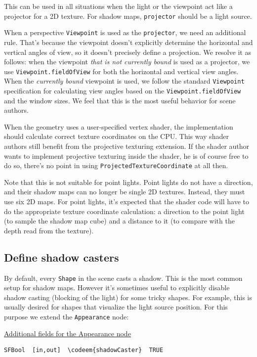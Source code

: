 \documentclass{acmsiggraph}                     %
\newenvironment{mycode}
{\begin{mycodecore}}
{\end{mycodecore}
\vspace{-0.1in}}
\newcommand*{\codeem}[1]{\textbf{#1}}
\begin{document}
This can be used in all situations when the light or the viewpoint act like
a projector for a 2D texture. For shadow maps, \texttt{projector} should be
a light source.

When a perspective \texttt{Viewpoint} is used as the \texttt{projector},
we need an additional rule. That's because the viewpoint doesn't explicitly
determine the horizontal and vertical angles of view, so it doesn't precisely
define a projection. We resolve it as follows: when the viewpoint
\emph{that is not currently bound} is used as a projector,
we use \texttt{Viewpoint.fieldOfView} for both the horizontal and vertical
view angles. When the \emph{currently bound} viewpoint is used,
we follow the standard \texttt{Viewpoint} specification for calculating
view angles based on the \texttt{Viewpoint.fieldOfView} and the window sizes.
We feel that this is the most useful behavior for scene authors.

When the geometry uses a user-specified vertex shader, the implementation
should calculate correct texture coordinates on the CPU.
This way shader authors still benefit from the projective texturing extension.
If the shader author wants to implement projective texturing inside the shader,
he is of course free to do so, there's no point in using
\texttt{ProjectedTextureCoordinate} at all then.

Note that this is not suitable for point lights. Point lights
do not have a direction, and their shadow maps can no longer be
single 2D textures. Instead, they must use six 2D maps.
For point lights, it's expected that the shader code will have
to do the appropriate
texture coordinate calculation: a direction to the point light
(to sample the shadow map cube) and a distance to it (to compare
with the depth read from the texture).

\subsection{Define shadow casters}
\label{sec_shadow_caster}

By default, every \texttt{Shape} in the scene casts a shadow.
This is the most common setup for shadow maps.
However it's sometimes useful to explicitly
disable shadow casting (blocking of the light) for some tricky shapes.
For example, this is usually desired for shapes that visualize
the light source position.
For this purpose we extend the \texttt{Appearance} node:

\begin{mycode}
\underline{Additional fields for the Appearance node}
\begin{Verbatim}[commandchars=\\\{\}]
SFBool  [in,out]  \codeem{shadowCaster}  TRUE
\end{Verbatim}
\end{mycode}
\end{document}
